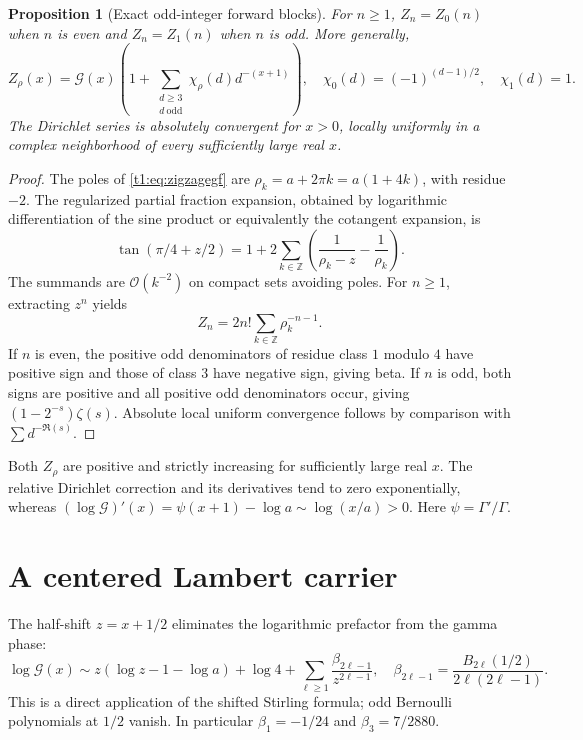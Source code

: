 \documentclass[11pt,openany]{book}
\numberwithin{equation}{chapter}
\theoremstyle{plain}
\newtheorem{proposition}[theorem]{Proposition}
\theoremstyle{definition}
\theoremstyle{remark}
\newcommand{\OO}{\mathcal O}\newcommand{\bigO}{\mathcal O}
\begin{document}
\begin{proposition}[Exact odd-integer forward blocks]\label{t1:prop:zigzagblocks}
For $n\ge1$,
$Z_n=Z_0(n)$ when $n$ is even and $Z_n=Z_1(n)$ when $n$ is odd. More generally,
\begin{equation}
 Z_\rho(x)=\mathcal G(x)
 \left(1+\sum_{\substack{d\ge3\\d\ \mathrm{odd}}}
 \chi_\rho(d)d^{-(x+1)}\right),
 \quad
 \chi_0(d)=(-1)^{(d-1)/2},\quad \chi_1(d)=1.
 \label{t1:eq:zigzagdirichlet}
\end{equation}
The Dirichlet series is absolutely convergent for $x>0$, locally uniformly in a complex neighborhood of every sufficiently large real $x$.
\end{proposition}
\begin{proof}
The poles of \eqref{t1:eq:zigzagegf} are $\rho_k=a+2\pi k=a(1+4k)$, with residue $-2$. The regularized partial fraction expansion, obtained by logarithmic differentiation of the sine product or equivalently the cotangent expansion, is
\[
 \tan(\pi/4+z/2)=1+
 2\sum_{k\in\mathbb Z}\left(\frac1{\rho_k-z}-\frac1{\rho_k}\right).
\]
The summands are $\OO(k^{-2})$ on compact sets avoiding poles. For $n\ge1$, extracting $z^n$ yields
\[
 Z_n=2n!\sum_{k\in\mathbb Z}\rho_k^{-n-1}.
\]
If $n$ is even, the positive odd denominators of residue class $1$ modulo $4$ have positive sign and those of class $3$ have negative sign, giving beta. If $n$ is odd, both signs are positive and all positive odd denominators occur, giving $(1-2^{-s})\zeta(s)$. Absolute local uniform convergence follows by comparison with $\sum d^{-\Re(s)}$.
\end{proof}

Both $Z_\rho$ are positive and strictly increasing for sufficiently large real $x$. The relative Dirichlet correction and its derivatives tend to zero exponentially, whereas
$(\log\mathcal G)'(x)=\psi(x+1)-\log a\sim\log(x/a)>0$.
Here $\psi=\Gamma'/\Gamma$.

\section{A centered Lambert carrier}
The half-shift $z=x+1/2$ eliminates the logarithmic prefactor from the gamma phase:
\begin{equation}
 \log\mathcal G(x)\sim z(\log z-1-\log a)+\log4
 +\sum_{\ell\ge1}\frac{\beta_{2\ell-1}}{z^{2\ell-1}},
 \quad
 \beta_{2\ell-1}=\frac{B_{2\ell}(1/2)}{2\ell(2\ell-1)}.
 \label{t1:eq:zigzagphase}
\end{equation}
This is a direct application of the shifted Stirling formula; odd Bernoulli polynomials at $1/2$ vanish. In particular $\beta_1=-1/24$ and $\beta_3=7/2880$.
\end{document}
